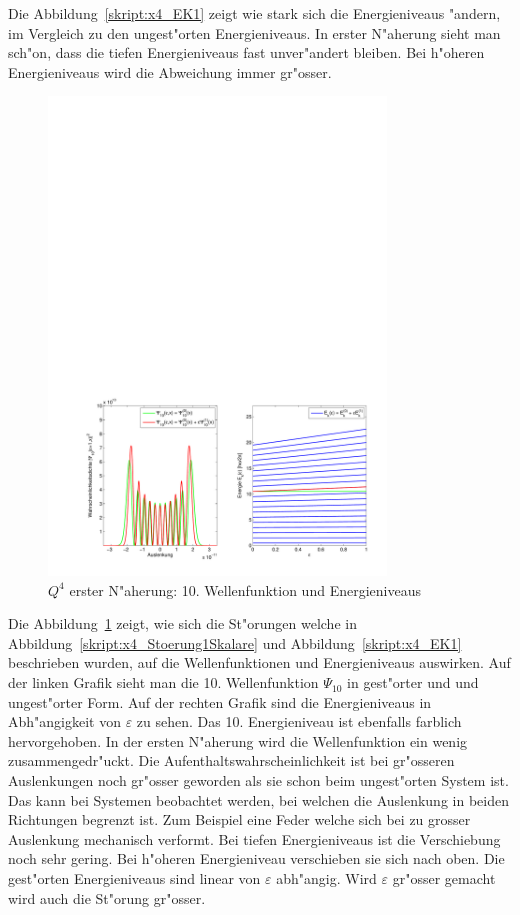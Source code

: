 \begin{refsection}
Die Abbildung~\ref{skript:x4_EK1} zeigt wie stark sich die Energieniveaus "andern,
im Vergleich zu den ungest"orten Energieniveaus.
In erster N"aherung sieht man sch"on, dass die tiefen Energieniveaus fast unver"andert
bleiben. Bei h"oheren Energieniveaus wird die Abweichung immer gr"osser.  

\begin{figure}	%
\centering
\includegraphics[width=0.8\textwidth]{anharmonisch/images/x4/Stoerung1Wellenfunktion.pdf}
\caption{$Q^4$ erster N"aherung: 10. Wellenfunktion und Energieniveaus
\label{skript:x4_Stoerung1Wellenfunktion}}
\end{figure}

Die Abbildung~\ref{skript:x4_Stoerung1Wellenfunktion} zeigt,
wie sich die St"orungen welche in Abbildung~\ref{skript:x4_Stoerung1Skalare} und
Abbildung~\ref{skript:x4_EK1} beschrieben wurden, auf die Wellenfunktionen und
Energieniveaus auswirken.
Auf der linken Grafik sieht man die 10. Wellenfunktion $\Psi_{10}$ in gest"orter und
und ungest"orter Form.
Auf der rechten Grafik sind die Energieniveaus in Abh"angigkeit von $\varepsilon$
zu sehen.
Das 10. Energieniveau ist ebenfalls farblich hervorgehoben.
In der ersten N"aherung wird die Wellenfunktion ein wenig zusammengedr"uckt.
Die Aufenthaltswahrscheinlichkeit ist bei gr"osseren Auslenkungen noch gr"osser
geworden als sie schon beim ungest"orten System ist.
Das kann bei Systemen beobachtet werden, bei welchen die Auslenkung in beiden
Richtungen begrenzt ist.
Zum Beispiel eine Feder welche sich bei zu grosser Auslenkung mechanisch verformt.
Bei tiefen Energieniveaus ist die Verschiebung noch sehr gering.
Bei h"oheren Energieniveau verschieben sie sich nach oben.
Die gest"orten Energieniveaus sind linear von $\varepsilon$ abh"angig.
Wird $\varepsilon$ gr"osser gemacht wird auch die St"orung gr"osser.



\end{refsection}
